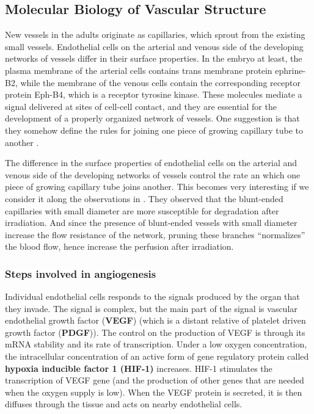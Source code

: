 \subsection{Molecular Biology of Vascular Structure}

New vessels in the adults originate as capillaries, which sprout from the existing small vessels. Endothelial cells on the arterial and venous side of the developing networks of vessels differ in their surface properties. In the embryo at least, the plasma membrane of the arterial cells contains trans membrane protein ephrine-B2, while the membrane of the venous cells contain the corresponding receptor protein Eph-B4, which is a receptor tyrosine kinase. These molecules mediate a signal delivered at sites of cell-cell contact, and they are essential for the development of a properly organized network of vessels. One suggestion is that they somehow define the rules for joining one piece of growing capillary tube to another \cite{Alberts2002}.


\begin{observation}
	The difference in the surface properties of endothelial cells on the arterial and venous side of the developing networks of vessels control the rate an which one piece of growing capillary tube joins another. This becomes very interesting if we consider it along the observations in \cite{Koery2024}. They observed that the blunt-ended capillaries with small diameter are more susceptible for degradation after irradiation. And since the presence of blunt-ended vessels with small diameter increase the flow resistance of the network, pruning these branches ``normalizes'' the blood flow, hence increase the perfusion after irradiation.
\end{observation}





\subsubsection{Steps involved in angiogenesis}
Individual endothelial cells responds to the signals produced by the organ that they invade. The signal is complex, but the main part of the signal is vascular endothelial growth factor (\textbf{VEGF}) (which is a distant relative of platelet driven growth factor (\textbf{PDGF})). The control on the production of VEGF is through its mRNA stability and its rate of transcription. Under a low oxygen concentration, the  intracellular concentration of an active form of gene regulatory protein called \textbf{hypoxia inducible factor 1 (HIF-1)} increases. HIF-1 stimulates the transcription of VEGF gene (and the production of other genes that are needed when the oxygen supply is low). When the VEGF protein is secreted, it is then diffuses through the tissue and acts on nearby endothelial cells.


